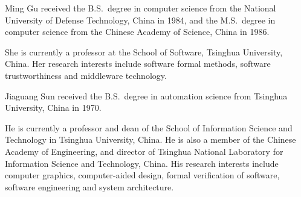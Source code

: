 \documentclass[journal]{IEEEtranTIE}
\begin{document}
\vspace{-5mm}
\begin{IEEEbiography}%
{Ming Gu} received the B.S.\ degree in computer science from the
National University of Defense Technology, China in 1984, and the
M.S.\ degree in computer science from the Chinese Academy of Science,
China in 1986.
 
She is currently a professor at the School of Software, Tsinghua
University, China.  Her research interests include software formal
methods, software trustworthiness and middleware technology.
\end{IEEEbiography}

\vspace{-5mm}
\begin{IEEEbiography}%
{Jiaguang Sun} received the B.S.\ degree in automation science from
Tsinghua University, China in 1970.  

He is currently a professor and dean of the School of Information
Science and Technology in Tsinghua University, China. He is also a
member of the Chinese Academy of Engineering, and director of Tsinghua
National Laboratory for Information Science and Technology, China.
His research interests include computer graphics, computer-aided
design, formal verification of software, software engineering and
system architecture.
\end{IEEEbiography}
\end{document}
